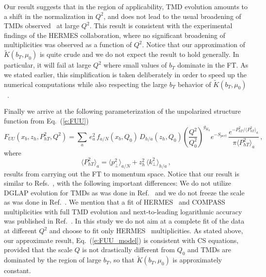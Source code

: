 \documentclass[final,3p,times,onecolumn,sort&compress,hidelinks]{elsarticle}
\newcommand{\xbj}{x_b}
\newcommand{\zh}{z_h}
\newcommand{\crd}{\color{red}}
\begin{document}
Our result suggests that in the region of applicability, TMD evolution  amounts to a  shift in the normalization in $Q^2$, and does not lead to the usual broadening of TMDs observed~\cite{Collins:2011zzd} at large $Q^2$. This result is consistent with the experimental findings \cite{Airapetian:2012ki} of the  HERMES collaboration, where no significant broadening of multiplicities was observed as a function of $Q^2$. Notice that our approximation of {\crd $\tilde K(b_T,\mu_0)$} is  quite crude  and  we do not expect the result to hold  generally.  In particular, it will fail at large $Q^2$ where {\crd small} values of $b_T$ dominate in the FT.  As we stated earlier, this simplification is taken deliberately
{\crd in order to 
  speed up the numerical computations while also respecting the large $b_T$
behavior of $\tilde K(b_T,\mu_0)$~\cite{Collins:2014jpa}.}


Finally we arrive at the following parameterization of the unpolarized structure function from Eq.~(\ref{e:FUU}) 
\begin{equation}
F_{UU}(\xbj,\zh,P_{hT}^2,Q^2)  =  \sum_{a} \, e_a^2 \,f_{a/N}(\xbj, Q_0)\,D_{h/a}(\zh, Q_0) \left( \frac{Q^2}{Q_0^2}\right)^{g_{K_0}}e^{-S_{pert}}\,
\frac{e^{-P_{hT}^2/\langle P_{hT}^2 \rangle_a}}{\pi\langle P_{hT}^2 \rangle_a}\,, \label{e:FUU_model}
\end{equation}
 where
\begin{equation}
\langle P_{hT}^2 \rangle_a = \langle p_\perp^2 \rangle_{a/N} + \zh^2\, \langle k_\perp^2 \rangle_{h/a}\,, \label{e:avg_kT}
\end{equation}
results from carrying out the  FT to momentum space.
Notice that our result is similar to Refs.~\cite{Anselmino:2013lza,Signori:2013mda}, with the following important differences:
We do not utilize DGLAP evolution for TMDs as was done in Ref.~\cite{Anselmino:2013lza} and we do not freeze the scale as was done in Ref.~\cite{Signori:2013mda}. We mention that a fit of HERMES~\cite{Airapetian:2012ki}  and COMPASS~\cite{Adolph:2013stb} multiplicities with full TMD evolution and next-to-leading logarithmic accuracy was published in Ref.~\cite{Bacchetta:2017gcc}. In this study we do not aim at a complete fit of the data at different $Q^2$ and choose to fit only HERMES~\cite{Airapetian:2012ki} multiplicities.
{\crd As stated above, our}  approximate result, Eq.~(\ref{e:FUU_model}) is consistent with CS equations, provided that the scale $Q$ is not drastically different from $Q_0$ and TMDs are dominated by the region of large $b_T$, so that $\tilde K(b_T,\mu_0)$ is approximately constant.
\end{document}
